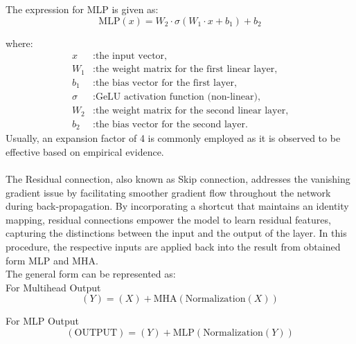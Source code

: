 The expression for MLP is given as:\\

\begin{equation}
    \text{MLP}(x) = W_2 \cdot \sigma(W_1 \cdot x + b_1) + b_2 \label{eq:mlp}
\end{equation}

where:
\begin{align*}
    x      & : \text{the input vector,}                              \\
    W_1    & : \text{the weight matrix for the first linear layer,}  \\
    b_1    & : \text{the bias vector for the first layer,}           \\
    \sigma & : \text{GeLU activation function (non-linear),}         \\
    W_2    & : \text{the weight matrix for the second linear layer,} \\
    b_2    & : \text{the bias vector for the second layer.}
\end{align*}
Usually, an expansion factor of 4 is commonly employed as it is observed to be effective based on empirical evidence.\\
\\
The Residual connection, also known as Skip connection, addresses the vanishing gradient issue by facilitating smoother gradient flow throughout the network during back-propagation. By incorporating a shortcut that maintains an identity mapping, residual connections empower the model to learn residual features, capturing the distinctions between the input and the output of the layer. In this procedure, the respective inputs are applied back into the result from obtained form MLP and MHA.\\

The general form can be represented as:\\

For Multihead Output\\
\begin{equation}
    (Y) = (X) + \text{MHA} (\text{Normalization} (X)) \label{eq:multihead_output}
\end{equation}


For MLP Output
\begin{equation}
    (\text{OUTPUT}) = (Y) + \text{MLP} (\text{Normalization} (Y)) \label{eq:mlp_output}
\end{equation}

